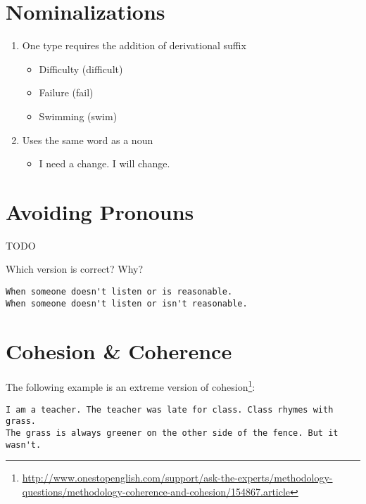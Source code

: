 \documentclass[10pt,a4paper]{book}
\begin{document}
\section{Nominalizations}
\begin{enumerate}
\item One type requires the addition of derivational suffix
\begin{itemize}
\item Difficulty (difficult)
\item  Failure (fail)
\item Swimming (swim)
\end{itemize}
\item Uses the same word as a noun
\begin{itemize}
\item I need a change. I will change.
\end{itemize}
\end{enumerate}


\section{Avoiding Pronouns}\label{Avoiding Pronouns}

\color{BrickRed}TODO\color{black}





Which version is correct? Why?
\begin{verbatim}
When someone doesn't listen or is reasonable.
When someone doesn't listen or isn't reasonable.
\end{verbatim}


\section{Cohesion \& Coherence}

The following example is an extreme version of cohesion\footnote{\url{http://www.onestopenglish.com/support/ask-the-experts/methodology-questions/methodology-coherence-and-cohesion/154867.article}}:
\begin{verbatim}
I am a teacher. The teacher was late for class. Class rhymes with grass.
The grass is always greener on the other side of the fence. But it wasn't.
\end{verbatim}
\end{document}
